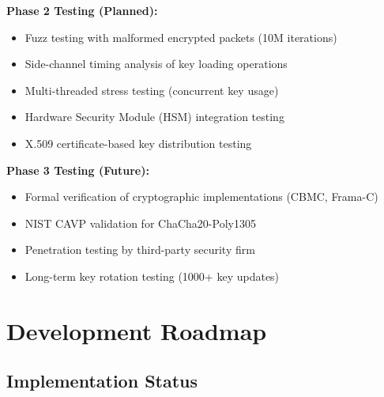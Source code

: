 \documentclass[11pt,a4paper]{article}
\begin{document}
\textbf{Phase 2 Testing (Planned):}
\begin{itemize}[noitemsep]
	\item Fuzz testing with malformed encrypted packets (10M iterations)
	\item Side-channel timing analysis of key loading operations
	\item Multi-threaded stress testing (concurrent key usage)
	\item Hardware Security Module (HSM) integration testing
	\item X.509 certificate-based key distribution testing
\end{itemize}

\textbf{Phase 3 Testing (Future):}
\begin{itemize}[noitemsep]
	\item Formal verification of cryptographic implementations (CBMC, Frama-C)
	\item NIST CAVP validation for ChaCha20-Poly1305
	\item Penetration testing by third-party security firm
	\item Long-term key rotation testing (1000+ key updates)
\end{itemize}

\newpage
\section{Development Roadmap}

\subsection{Implementation Status}
\end{document}
